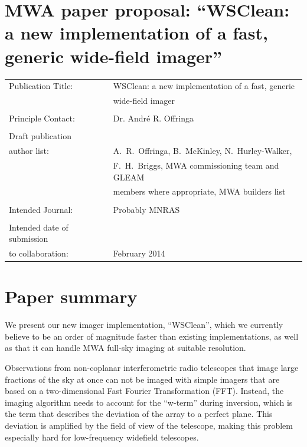 \documentclass[a4paper,10pt]{article}
\begin{document}
\label{firstpage}
\section*{MWA paper proposal: ``WSClean: a new implementation of a fast, generic wide-field imager''}
\begin{tabular}{ll}
Publication Title: & WSClean: a new implementation of a fast, generic \\
                   & wide-field imager\\
                   & \\
Principle Contact: & Dr. Andr\'e R. Offringa \\
                   & \\
Draft publication\\
\hspace{5mm}author list: & A.~R.~Offringa, B.~McKinley, N.~Hurley-Walker, \\
                         & F.~H.~Briggs, MWA commissioning team and GLEAM \\
                         & members where appropriate, MWA builders list \\
                   & \\
Intended Journal: & Probably MNRAS\\
                   & \\
Intended date of submission\\
\hspace{5mm}to collaboration: & February 2014\\
\end{tabular}

\section*{Paper summary}
We present our new imager implementation, ``WSClean'', which we currently believe to be an order of magnitude faster than existing implementations, as well as that it can handle MWA full-sky imaging at suitable resolution.

Observations from non-coplanar interferometric radio telescopes that image large fractions of the sky at once can not be imaged with simple imagers that are based on a two-dimensional Fast Fourier Transformation (FFT). Instead, the imaging algorithm needs to account for the ``w-term'' during inversion, which is the term that describes the deviation of the array to a perfect plane. This deviation is amplified by the field of view of the telescope, making this problem especially hard for low-frequency widefield telescopes.
\end{document}
